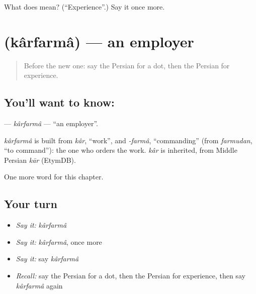 \begin{tcolorbox}[breakable,colback=teal!4,colframe=teal!35!black,title={Before you move on}]
What does  mean? (\textquotedblleft{}Experience\textquotedblright{}.) Say it once more.
\end{tcolorbox}
\section[\texorpdfstring{\fa{کارفرما} (kârfarmâ)}{کارفرما (kârfarmâ)}]{ (kârfarmâ) — an employer}

\label{lesson:FA-C214-karfarma}



\begin{quote}
Before the new one: say the Persian for a dot, then the Persian for experience.
\end{quote}

\subsection*{You'll want to know: }
\textbf{} — \emph{kârfarmâ} — \textquotedblleft{}an employer\textquotedblright{}.

\begin{cousinweb}
\emph{kârfarmâ} is built from \emph{kâr}, \textquotedblleft{}work\textquotedblright{}, and \emph{-farmâ}, \textquotedblleft{}commanding\textquotedblright{} (from \emph{farmudan}, \textquotedblleft{}to command\textquotedblright{}): the one who orders the work. \emph{kâr} is inherited, from Middle Persian \emph{kār} (EtymDB).
\end{cousinweb}

\begin{grammarlens}[title={What you've built}]
One more word for this chapter.
\end{grammarlens}

\subsection*{Your turn}
\begin{itemize}
\raggedright
  \item \emph{Say it:} \emph{kârfarmâ}
  \item \emph{Say it:} \emph{kârfarmâ}, once more
  \item \emph{Say it:} say \emph{kârfarmâ}
  \item \emph{Recall:} say the Persian for a dot, then the Persian for experience, then say \emph{kârfarmâ} again
\end{itemize}

